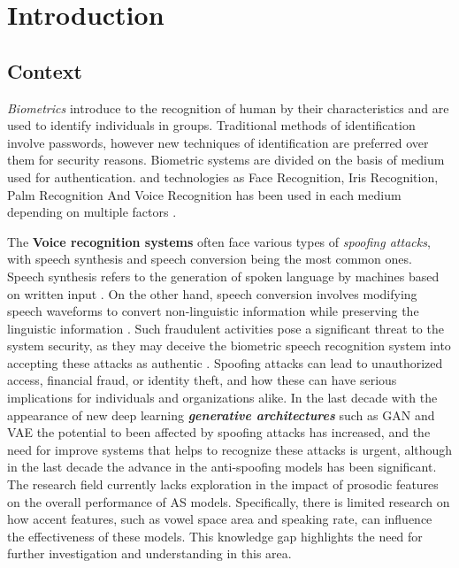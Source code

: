 \chapter{Introduction}

\section{Context}

\textit{Biometrics} introduce to the recognition of human by their characteristics and are used to identify individuals in groups. Traditional methods of identification involve passwords, however new techniques of identification are preferred over them for security reasons. Biometric systems are divided on the basis of medium used for authentication. and technologies as Face Recognition, Iris Recognition, Palm Recognition And Voice Recognition has been used in each medium depending on multiple factors \cite{kaur2014review}.

The \textbf{Voice recognition systems} often face various types of \textit{spoofing attacks}, with speech synthesis and speech conversion being the most common ones. Speech synthesis refers to the generation of spoken language by machines based on written input \cite{oxforddictionary}. On the other hand, speech conversion involves modifying speech waveforms to convert non-linguistic information while preserving the linguistic information \cite{stylianou1998continuous}. Such fraudulent activities pose a significant threat to the system security, as they may deceive the biometric speech recognition system into accepting these attacks as authentic \cite{xue2023physiological}. Spoofing attacks can lead to unauthorized access, financial fraud, or identity theft, and how these can have serious implications for individuals and organizations alike. In the last decade with the appearance of new deep learning \textbf{\textit{generative architectures}} such as \ac{GAN} \cite{goodfellow2020generative} and \ac{VAE} \cite{kingma2013auto} the potential to been affected by spoofing attacks has increased, and the need for improve systems that helps to recognize these attacks is urgent, although in the last decade the advance in the anti-spoofing models has been significant. The research field currently lacks exploration in the impact of prosodic features on the overall performance of \ac{AS} models. Specifically, there is limited research on how accent features, such as vowel space area and speaking rate, can influence the effectiveness of these models. This knowledge gap highlights the need for further investigation and understanding in this area.

